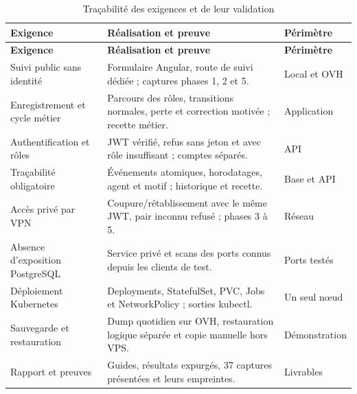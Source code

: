 \documentclass[11pt]{extarticle}
\begin{document}
\begin{longtable}{p{4.2cm}p{6.8cm}p{2.5cm}}
\caption{Traçabilité des exigences et de leur validation}\\\toprule
\textbf{Exigence} & \textbf{Réalisation et preuve} & \textbf{Périmètre}\\\midrule\endfirsthead
\toprule\textbf{Exigence} & \textbf{Réalisation et preuve} & \textbf{Périmètre}\\\midrule\endhead
Suivi public sans identité & Formulaire Angular, route de suivi dédiée ; captures phases 1, 2 et 5. & Local et OVH\\
Enregistrement et cycle métier & Parcours des rôles, transitions normales, perte et correction motivée ; recette métier. & Application\\
Authentification et rôles & JWT vérifié, refus sans jeton et avec rôle insuffisant ; comptes séparés. & API\\
Traçabilité obligatoire & Événements atomiques, horodatages, agent et motif ; historique et recette. & Base et API\\
Accès privé par VPN & Coupure/rétablissement avec le même JWT, pair inconnu refusé ; phases 3 à 5. & Réseau\\
Absence d'exposition PostgreSQL & Service privé et scans des ports connus depuis les clients de test. & Ports testés\\
Déploiement Kubernetes & Deployments, StatefulSet, PVC, Jobs et NetworkPolicy ; sorties kubectl. & Un seul nœud\\
Sauvegarde et restauration & Dump quotidien sur OVH, restauration logique séparée et copie manuelle hors VPS. & Démonstration\\
Rapport et preuves & Guides, résultats expurgés, 37 captures présentées et leurs empreintes. & Livrables\\\bottomrule
\end{longtable}

\FloatBarrier
\end{document}
